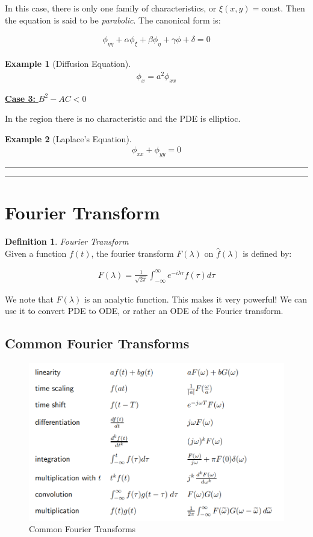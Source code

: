 \documentclass{article}
\newtheorem{ex}{Example}
\theoremstyle{definition}
\newtheorem{definition}{Definition}[section]
\newcommand{\Section}[1]{\hrule\hrule\section{#1}}
\newcommand{\Def}[2]{
\begin{shaded*}
\begin{definition}{\textit{#1}}\\#2\end{definition}
\end{shaded*}
}
\begin{document}
In this case, there is only one family of characteristics, or $\xi(x,y) = \text{const}$. Then the equation is said to be \textit{parabolic}. The canonical form is:

\begin{align*}
\phi_{\eta \eta} + \alpha \phi_\xi + \beta \phi_\eta + \gamma \phi + \delta = 0
\end{align*}

\begin{ex}[Diffusion Equation]

\begin{align*}
\phi_x = a^2 \phi_{xx}
\end{align*}
\end{ex}

\underline{\textbf{Case 3:} $B^2-AC < 0$}

In the region there is no characteristic and the PDE is elliptioc.

\begin{ex}[Laplace's Equation]
\begin{align*}
\phi_{xx} + \phi_{yy} = 0
\end{align*}
\end{ex}

\Section{Fourier Transform }

\Def{Fourier Transform}{Given a function $f(t)$, the fourier transform $F(\lambda)$ on $\hat{f}(\lambda)$ is defined by:

\begin{align*}
F(\lambda) = \frac{1}{\sqrt{2\pi}} \int_{-\infty}^{\infty} e^{-i \lambda \tau} f(\tau) d\tau
\end{align*}

We note that $F(\lambda)$ is an analytic function. This makes it very powerful! We can use it to convert PDE to ODE, or rather an ODE of the Fourier transform.
}

\subsection{Common Fourier Transforms}
\begin{figure}[H]
	\centering
	\includegraphics[width=0.7\linewidth]{common_fourier}
	\caption{Common Fourier Transforms}
	\label{fig:commonfourier}
\end{figure}
\end{document}
